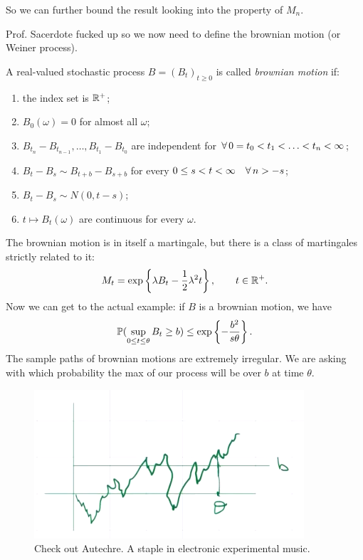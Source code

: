 \documentclass{report}
\begin{document}
So we can further bound the result looking into the property of $M_{n}$.
\begin{example}
	Prof. Sacerdote fucked up so we now need to define the brownian motion (or Weiner process).
	\begin{definition}
		A real-valued stochastic process $B={(B_{t})}_{t\geq0}$ is called \emph{brownian motion} if:
		\begin{enumerate}
			\item the index set is $\mathbb{R}^{+}$;
			\item $B_{0}(\omega)=0$ for almost all $\omega$;
			\item $B_{t_{n}}-B_{t_{n-1}},\ldots,B_{t_{1}}-B_{t_{0}}$ are independent for $\forall\, 0=t_{0}<t_1<\ldots<t_n<\infty$;
			\item $B_{t}-B_{s}\sim B_{t+b}-B_{s+b}$ for every $0\leq s<t<\infty\quad\forall\, n>- s$;
			\item $B_{t}-B_{s}\sim N(0,t-s)$;
			\item $t\mapsto B_{t}(\omega)$ are continuous for every $\omega$.
		\end{enumerate}
	\end{definition}
	The brownian motion is in itself a martingale, but there is a class of martingales strictly related to it:
	\begin{equation*}
		M_{t}=\exp\left\{\lambda B_{t}-\frac{1}{2}\lambda^{2}t\right\},\qquad t\in\mathbb{R}^{+}.
	\end{equation*}
	Now we can get to the actual example: if $B$ is a brownian motion, we have 
	\begin{equation*}
		\mathbb{P}(\sup_{0\leq t\leq\theta}B_{t}\geq b)\leq\exp\left\{-\frac{b^{2}}{s\theta}\right\}.
	\end{equation*}
	The sample paths of brownian motions are extremely irregular. We are asking with which probability the max of our process will be over $b$ at time $\theta$.
	\begin{figure}[H]
		\centering
		\includegraphics[width=0.6\linewidth]{screenshot018}
		\caption{Check out Autechre. A staple in electronic experimental music.}

\end{figure}
\end{example}
\end{document}
